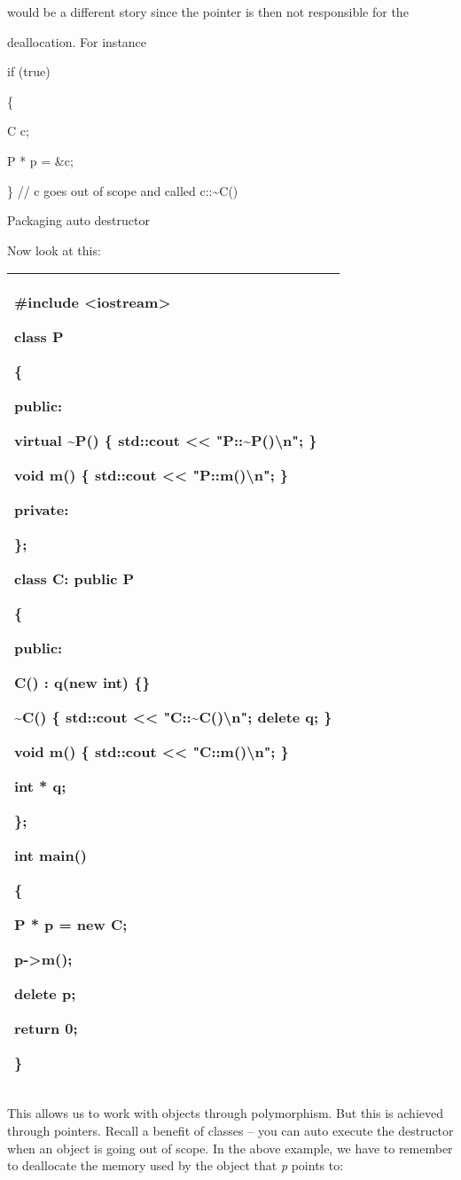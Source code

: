 \documentclass[
]{article}
\begin{document}
would be a different story since the pointer is then not responsible for
the

deallocation. For instance

if (true)

\{

C c;

P * p = \&c;

\} // c goes out of scope and called c::\textasciitilde C()

Packaging auto destructor

Now look at this:

\begin{longtable}[]{@{}l@{}}
\toprule
\endhead
\begin{minipage}[t]{0.97\columnwidth}\raggedright
\#include \textless iostream\textgreater{}

class P

\{

public:

\textbf{ }virtual \textasciitilde P() \{ std::cout \textless\textless{}
"P::\textasciitilde P()\textbackslash n"; \}

void m() \{ std::cout \textless\textless{} "P::m()\textbackslash n"; \}

private:

\};

class C: public P

\{

public:

C() : q(new int) \{\}

\textasciitilde C() \{ std::cout \textless\textless{}
"C::\textasciitilde C()\textbackslash n"; delete q; \}

void m() \{ std::cout \textless\textless{} "C::m()\textbackslash n"; \}

int * q;

\};

int main()

\{

P * p = new C;

p-\textgreater m();

delete p;

return 0;

\}\strut
\end{minipage}\tabularnewline
\bottomrule
\end{longtable}

This allows us to work with objects through polymorphism. But this is
achieved through pointers. Recall a benefit of classes -- you can auto
execute the destructor when an object is going out of scope. In the
above example, we have to remember to deallocate the memory used by the
object that \emph{p} points to:
\end{document}
